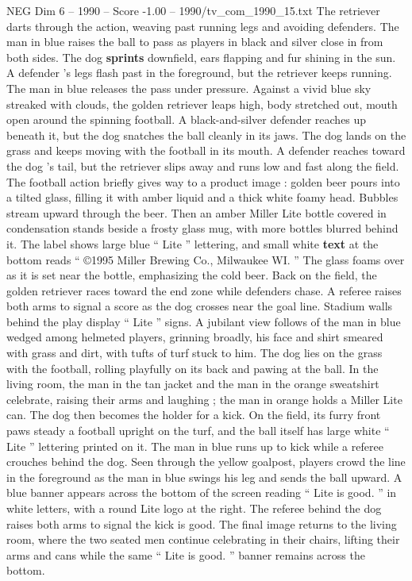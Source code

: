 \begin{textsample}{NEG Dim 6 – 1990 – Score -1.00 – 1990/tv\_com\_1990\_15.txt}
The retriever darts through the action, weaving past running legs and avoiding defenders.
The man in blue raises the ball to pass as players in black and silver close in from both sides.
The dog \textbf{sprints} downfield, ears flapping and fur shining in the sun.
A defender ’s legs flash past in the foreground, but the retriever keeps running.
The man in blue releases the pass under pressure.
Against a vivid blue sky streaked with clouds, the golden retriever leaps high, body stretched out, mouth open around the spinning football.
A black-and-silver defender reaches up beneath it, but the dog snatches the ball cleanly in its jaws.
The dog lands on the grass and keeps moving with the football in its mouth.
A defender reaches toward the dog ’s tail, but the retriever slips away and runs low and fast along the field.
The football action briefly gives way to a product image : golden beer pours into a tilted glass, filling it with amber liquid and a thick white foamy head.
Bubbles stream upward through the beer.
Then an amber Miller Lite bottle covered in condensation stands beside a frosty glass mug, with more bottles blurred behind it.
The label shows large blue “ Lite ” lettering, and small white \textbf{text} at the bottom reads “ {\EmojiFont ©}1995 Miller Brewing Co., Milwaukee WI. ” The glass foams over as it is set near the bottle, emphasizing the cold beer.
Back on the field, the golden retriever races toward the end zone while defenders chase.
A referee raises both arms to signal a score as the dog crosses near the goal line.
Stadium walls behind the play display “ Lite ” signs.
A jubilant view follows of the man in blue wedged among helmeted players, grinning broadly, his face and shirt smeared with grass and dirt, with tufts of turf stuck to him.
The dog lies on the grass with the football, rolling playfully on its back and pawing at the ball.
In the living room, the man in the tan jacket and the man in the orange sweatshirt celebrate, raising their arms and laughing ; the man in orange holds a Miller Lite can.
The dog then becomes the holder for a kick.
On the field, its furry front paws steady a football upright on the turf, and the ball itself has large white “ Lite ” lettering printed on it.
The man in blue runs up to kick while a referee crouches behind the dog.
Seen through the yellow goalpost, players crowd the line in the foreground as the man in blue swings his leg and sends the ball upward.
A blue banner appears across the bottom of the screen reading “ Lite is good. ” in white letters, with a round Lite logo at the right.
The referee behind the dog raises both arms to signal the kick is good.
The final image returns to the living room, where the two seated men continue celebrating in their chairs, lifting their arms and cans while the same “ Lite is good. ” banner remains across the bottom.

\end{textsample}

